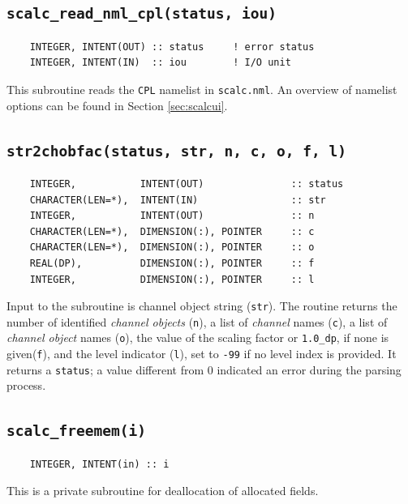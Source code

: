 \documentclass[twoside]{article}
\begin{document}
\subsection{{\tt scalc\_read\_nml\_cpl(status, iou)}}
\label{sec:scalc_read_nml_cpl}
%
\begin{verbatim}
    INTEGER, INTENT(OUT) :: status     ! error status
    INTEGER, INTENT(IN)  :: iou        ! I/O unit
\end{verbatim}
This subroutine reads the {\tt CPL} namelist in {\tt scalc.nml}.
An overview of namelist options can be found in Section \ref{sec:scalcui}.
%
\subsection{{\tt str2chobfac(status, str, n, c, o, f, l)}}
\label{sec:str2chobfac}
%
\begin{verbatim}
    INTEGER,           INTENT(OUT)               :: status
    CHARACTER(LEN=*),  INTENT(IN)                :: str
    INTEGER,           INTENT(OUT)               :: n
    CHARACTER(LEN=*),  DIMENSION(:), POINTER     :: c
    CHARACTER(LEN=*),  DIMENSION(:), POINTER     :: o
    REAL(DP),          DIMENSION(:), POINTER     :: f
    INTEGER,           DIMENSION(:), POINTER     :: l
\end{verbatim}
Input to the subroutine is channel object string ({\tt str}). The routine returns the number of identified {\it channel objects} ({\tt n}), a list of {\it channel} names ({\tt c}), a list of {\it channel object} names ({\tt o}), the value of the scaling factor or {\tt 1.0\_dp}, if none is given({\tt f}), and the level indicator ({\tt l}), set to {\tt -99} if no level index is provided.
It returns a {\tt status};  a value different from 0 indicated an error during the parsing process.
%
\subsection{{\tt scalc\_freemem(i)}}
\label{sec:scalc_freemem}
%
\begin{verbatim}
    INTEGER, INTENT(in) :: i
\end{verbatim}
This is a private subroutine for deallocation of allocated fields.
%
\end{document}
